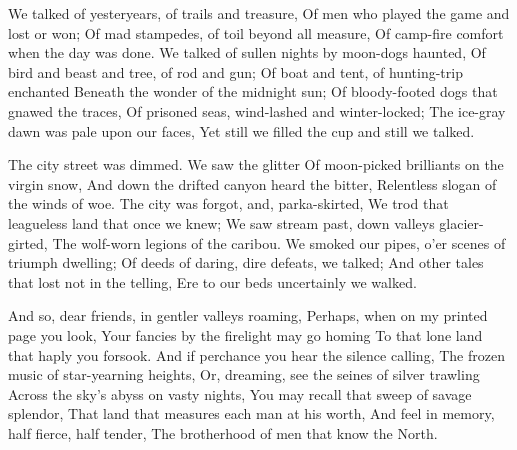 
\begin{poemblock}
  We talked of yesteryears, of trails and treasure,
   Of men who played the game and lost or won;
  Of mad stampedes, of toil beyond all measure,
   Of camp-fire comfort when the day was done.
  We talked of sullen nights by moon-dogs haunted,
   Of bird and beast and tree, of rod and gun;
  Of boat and tent, of hunting-trip enchanted
   Beneath the wonder of the midnight sun;
  Of bloody-footed dogs that gnawed the traces,
   Of prisoned seas, wind-lashed and winter-locked;
  The ice-gray dawn was pale upon our faces,
   Yet still we filled the cup and still we talked.

  The city street was dimmed.  We saw the glitter
   Of moon-picked brilliants on the virgin snow,
  And down the drifted canyon heard the bitter,
   Relentless slogan of the winds of woe.
  The city was forgot, and, parka-skirted,
   We trod that leagueless land that once we knew;
  We saw stream past, down valleys glacier-girted,
   The wolf-worn legions of the caribou.
  We smoked our pipes, o'er scenes of triumph dwelling;
   Of deeds of daring, dire defeats, we talked;
  And other tales that lost not in the telling,
   Ere to our beds uncertainly we walked.

  And so, dear friends, in gentler valleys roaming,
   Perhaps, when on my printed page you look,
  Your fancies by the firelight may go homing
   To that lone land that haply you forsook.
  And if perchance you hear the silence calling,
   The frozen music of star-yearning heights,
  Or, dreaming, see the seines of silver trawling
   Across the sky's abyss on vasty nights,
  You may recall that sweep of savage splendor,
   That land that measures each man at his worth,
  And feel in memory, half fierce, half tender,
   The brotherhood of men that know the North.

\end{poemblock}
